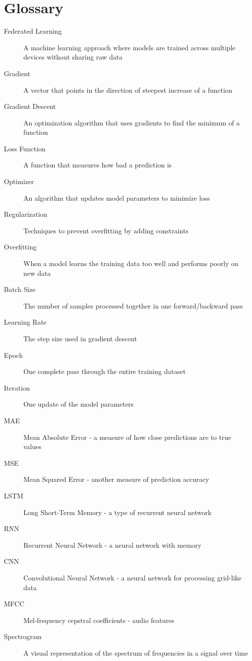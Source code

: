 \documentclass[12pt]{article}
\begin{document}
\section{Glossary}

\begin{description}
    \item[Federated Learning] A machine learning approach where models are trained across multiple devices without sharing raw data
    \item[Gradient] A vector that points in the direction of steepest increase of a function
    \item[Gradient Descent] An optimization algorithm that uses gradients to find the minimum of a function
    \item[Loss Function] A function that measures how bad a prediction is
    \item[Optimizer] An algorithm that updates model parameters to minimize loss
    \item[Regularization] Techniques to prevent overfitting by adding constraints
    \item[Overfitting] When a model learns the training data too well and performs poorly on new data
    \item[Batch Size] The number of samples processed together in one forward/backward pass
    \item[Learning Rate] The step size used in gradient descent
    \item[Epoch] One complete pass through the entire training dataset
    \item[Iteration] One update of the model parameters
    \item[MAE] Mean Absolute Error - a measure of how close predictions are to true values
    \item[MSE] Mean Squared Error - another measure of prediction accuracy
    \item[LSTM] Long Short-Term Memory - a type of recurrent neural network
    \item[RNN] Recurrent Neural Network - a neural network with memory
    \item[CNN] Convolutional Neural Network - a neural network for processing grid-like data
    \item[MFCC] Mel-frequency cepstral coefficients - audio features
    \item[Spectrogram] A visual representation of the spectrum of frequencies in a signal over time
\end{description}
\end{document}
